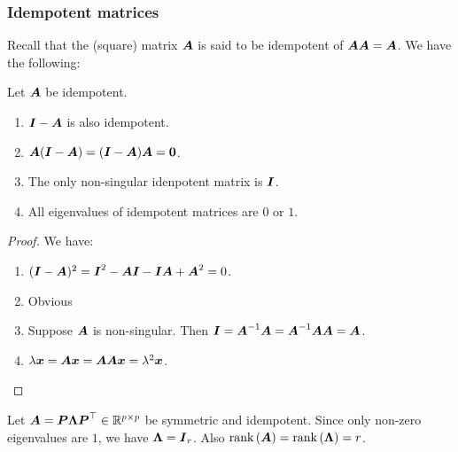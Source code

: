 \subsubsection{Idempotent matrices}
Recall that the (square) matrix $\mA$ is said to be idempotent of $\mA\mA=\mA$. We have the following:
\begin{proposition}
    Let $\mA$ be idempotent.
    \begin{enumerate}
        \item $\mI-\mA$ is also idempotent.
        \item $\mA(\mI-\mA)=(\mI-\mA)\mA=\zero$.
        \item The only non-singular idenpotent matrix is $\mI$.
        \item All eigenvalues of idempotent matrices are $0$ or $1$.
    \end{enumerate}
\end{proposition}
\begin{proof}
    We have:
    \begin{enumerate}
        \item $(\mI-\mA)^2=\mI^2-\mA\mI-\mI\mA+\mA^2=0$.
        \item Obvious
        \item Suppose $\mA$ is non-singular. Then $\mI=\mA^{-1}\mA=\mA^{-1}\mA\mA=\mA$.
        \item $\lambda\x=\mA\x=\mA\mA\x=\lambda^2\x$.
    \end{enumerate}
\end{proof}
Let $\mA=\boldsymbol{P}\boldsymbol{\Lambda}\boldsymbol{P}^\top\in\R^{p\times p}$ be symmetric and idempotent. Since only non-zero eigenvalues are $1$, we have $\mL=\mI_r$.
Also $\rank{\mA} = \rank{\boldsymbol{\Lambda}} = r$.


